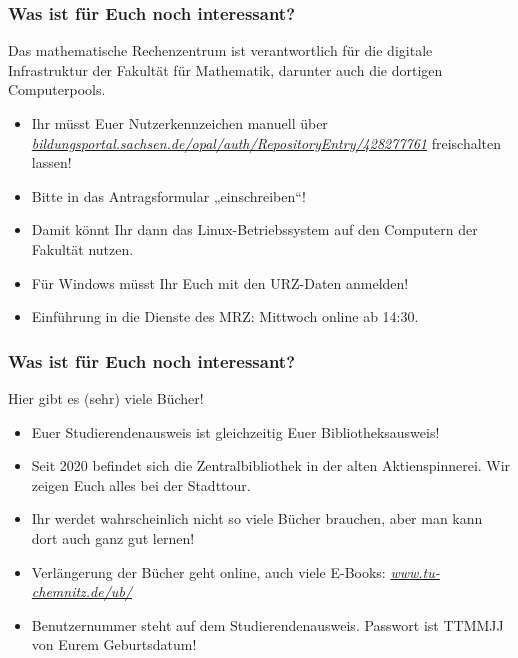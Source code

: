 \documentclass[10pt]{beamer}
\makeatletter
\newcommand{\highl}[1]{\color{tuccolor@ma}#1\color{black}}
\makeatother
\begin{document}
\begin{frame}
	\frametitle{Was ist für Euch noch interessant?}

	\begin{block}{\vphantom{X}}
		Das mathematische Rechenzentrum ist verantwortlich für die digitale Infrastruktur der Fakultät für Mathematik, darunter auch die dortigen Computerpools.
	\end{block}

	\begin{itemize}
		\item Ihr müsst Euer Nutzerkennzeichen manuell über \highl{\textit{\href{https://bildungsportal.sachsen.de/opal/auth/RepositoryEntry/428277761}{bildungsportal.sachsen.de/opal/auth/RepositoryEntry/428277761}} }freischalten lassen!
		\item Bitte in das Antragsformular „einschreiben“!
		\item Damit könnt Ihr dann das Linux-Betriebssystem auf den Computern der Fakultät nutzen.
		\item Für Windows müsst Ihr Euch mit den URZ-Daten anmelden! 
		\item Einführung in die Dienste des MRZ: Mittwoch online ab 14:30.
	\end{itemize}
\end{frame}

\begin{frame}
	\frametitle{Was ist für Euch noch interessant?}

	\begin{block}{\vphantom{X}}
		Hier gibt es (sehr) viele Bücher!
	\end{block}

	\begin{itemize}
		\item Euer Studierendenausweis ist gleichzeitig Euer Bibliotheksausweis!
		\item Seit 2020 befindet sich die Zentralbibliothek in der alten Aktienspinnerei. Wir zeigen Euch alles bei der Stadttour.
		\item Ihr werdet wahrscheinlich nicht so viele Bücher brauchen, aber man kann dort auch ganz gut lernen!
		\item Verlängerung der Bücher geht online, auch viele E-Books: \highl{\textit{\href{https://www.tu-chemnitz.de/ub/}{www.tu-chemnitz.de/ub/}}}
		\item Benutzernummer steht auf dem Studierendenausweis. Passwort ist TTMMJJ von Eurem Geburtsdatum!
	\end{itemize}
\end{frame}
\end{document}
